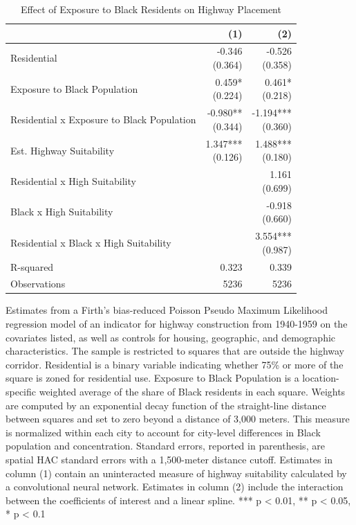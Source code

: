 \begin{table}[h]
\centering
\caption{Effect of Exposure to Black Residents on Highway Placement}
\label{tab:robustness/black_share_ppml}
\begin{threeparttable}
\begin{tabular*}{0.8\textwidth}{@{\extracolsep{\fill}}l*{2}{r}}
\toprule
 & (1) & (2) \\
\midrule
Residential & \makecell[tr]{-0.346 \\ (0.364)} & \makecell[tr]{-0.526 \\ (0.358)} \\
Exposure to Black Population & \makecell[tr]{0.459{*} \\ (0.224)} & \makecell[tr]{0.461{*} \\ (0.218)} \\
Residential x Exposure to Black Population & \makecell[tr]{-0.980{**} \\ (0.344)} & \makecell[tr]{-1.194{***} \\ (0.360)} \\
Est. Highway Suitability & \makecell[tr]{1.347{***} \\ (0.126)} & \makecell[tr]{1.488{***} \\ (0.180)} \\
Residential x High Suitability &  & \makecell[tr]{1.161 \\ (0.699)} \\
Black x High Suitability &  & \makecell[tr]{-0.918 \\ (0.660)} \\
Residential x Black x High Suitability &  & \makecell[tr]{3.554{***} \\ (0.987)} \\
R-squared & 0.323 & 0.339 \\
Observations & 5236 & 5236 \\
\bottomrule
\end{tabular*}
\begin{tablenotes}[flushleft]
\footnotesize
\item Estimates from a Firth's bias-reduced Poisson Pseudo Maximum Likelihood regression model of an indicator for highway construction from 1940-1959 on the covariates listed, as well as controls for housing, geographic, and demographic characteristics. The sample is restricted to squares that are outside the highway corridor. Residential is a binary variable indicating whether 75\% or more of the square is zoned for residential use. Exposure to Black Population is a location-specific weighted average of the share of Black residents in each square. Weights are computed by an exponential decay function of the straight-line distance between squares and set to zero beyond a distance of 3,000 meters. This measure is normalized within each city to account for city-level differences in Black population and concentration. Standard errors, reported in parenthesis, are \textcite{conley_gmm_1999} spatial HAC standard errors with a 1,500-meter distance cutoff. Estimates in column (1) contain an uninteracted measure of highway suitability calculated by a convolutional neural network. Estimates in column (2) include the interaction between the coefficients of interest and a linear spline. *** p < 0.01, ** p < 0.05, * p < 0.1

\end{tablenotes}
\end{threeparttable}
\end{table}
